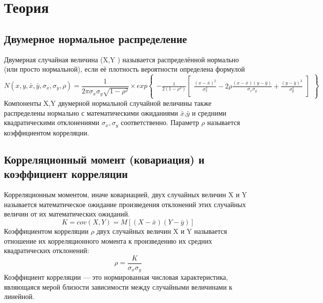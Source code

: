 \documentclass[12pt,a4paper]{scrartcl}
\begin{document}
\section{Теория}

\subsection{Двумерное нормальное распределение}
	Двумерная случайная величина (X,Y ) называется распределённой нормально (или просто нормальной), если её плотность вероятности определена формулой
	\begin{equation}
	    N(x, y, \bar{x}, \bar{y}, \sigma_{x}, \sigma_{y}, \rho) = 
	    \frac{1}{2\pi\sigma_{x}\sigma_{y}\sqrt{1-\rho^{2}}} \times
	    exp{\begin{Bmatrix}
	        -\frac{1}{2(1-\rho^{2})}
	        \begin{bmatrix}
	        \frac{(x-\bar{x})^{2}}{\sigma_{x}^{2}} - 2\rho\frac{(x-\bar{x})(y-\bar{y})}{\sigma_{x}\sigma_{y}} + \frac{(y-\bar{y})^{2}}{\sigma_{y}^{2}}
            \end{bmatrix}
            \end{Bmatrix}}
	\end{equation}
	Компоненты X,Y двумерной нормальной случайной величины также распределены нормально с математическими ожиданиями $\bar{x}$,$\bar{y}$ и средними квадратическими отклонениями $\sigma_{x},\sigma_{y}$ соответственно.
	Параметр $\rho$ называется коэффициентом корреляции.


	
	\subsection{Корреляционный момент (ковариация) и коэффициент корреляции}
	Корреляционным моментом, иначе ковариацией, двух случайных величин X и Y называется математическое ожидание произведения отклонений этих случайных величин от их математических ожиданий.
	\begin{equation}
	    K = cov(X, Y) = M[(X - \bar{x})(Y - \bar{y})]
	   \label{K}
	\end{equation}
	Коэффициентом корреляции $\rho$ двух случайных величин X и Y называется отношение их корреляционного момента к произведению их средних квадратических отклонений:
	\begin{equation}
	    \rho = \frac{K}{\sigma_{x}\sigma_{y}}
	    \label{ro}
	\end{equation}
	Коэффициент корреляции — это нормированная числовая характеристика, являющаяся мерой близости зависимости между случайными величинами к линейной.
\end{document}
